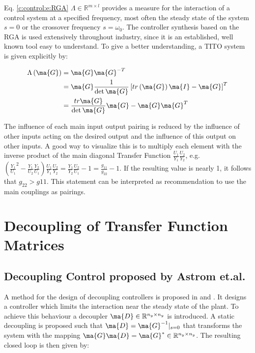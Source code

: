 Eq. \ref{c:control:e:RGA} $\Lambda \in \mathbb{R}^{m \times l}$ provides a measure for the interaction of a control system at a specified frequency, most often the steady state of the system $s=0$ or the crossover frequency $s=\omega_0$.\newline
The controller synthesis based on the RGA is used extensively throughout industry, since it is an established, well known tool easy to understand.\newline
To give a better understanding, a TITO system is given explicitly by:

\begin{align}
\begin{split}
\Lambda \left( \ma{G} \right) &= \ma{G} \ma{G}^{-T} \\
&= \ma{G} \frac{1}{\det{\ma{G}}} \left[ tr\left( \ma{G} \right)\ma{I} - \ma{G} \right]^T  \\
&= \frac{tr \ma{G} }{\det \ma{G}} \ma{G} - \ma{G}\ma{G}^T \\  
\end{split}
\end{align}

The influence of each main input output pairing is reduced by the influence of other inputs acting on the desired output and the influence of this output on other inputs. A good way to visualize this is to multiply each element with the inverse product of the main diagonal Transfer Function $\frac{U_1}{Y_1} \frac{U_2}{Y_2}$, e.g. $\left( \frac{Y_1}{U_1}^2 - \frac{Y_1}{U_2}\frac{Y_2}{U_1} \right) \frac{U_1}{Y_1} \frac{U_2}{Y_2} = \frac{Y_1}{Y_2} \frac{U_2}{U_1} -1 = \frac{g_{11}}{g_{22}} -1$. If the resulting value is nearly 1, it follows that $g_{22} > g{11}$. This statement can be interpreted as recommendation to use the main couplings as pairings. \\

\section{Decoupling of Transfer Function Matrices}

\subsection*{Decoupling Control proposed by Astrom et.al.}
A method for the design of decoupling controllers is proposed in \cite{Astrom2001a} and \cite{Astrom2006AdvancedControl}. It designs a controller which limits the interaction near the steady state of the plant. To achieve this behaviour a decoupler $\ma{D} \in  \mathbb{R}^{n_y \times n_y}$ is introduced. A static decoupling is proposed such that $\ma{D} = \ma{G}^{-1}|_{s=0}$ that transforms the system with the mapping $\ma{G} \ma{D} = \ma{G}^* \in \mathbb{R}^{n_y \times n_y}$. The resulting closed loop is then given by: 

